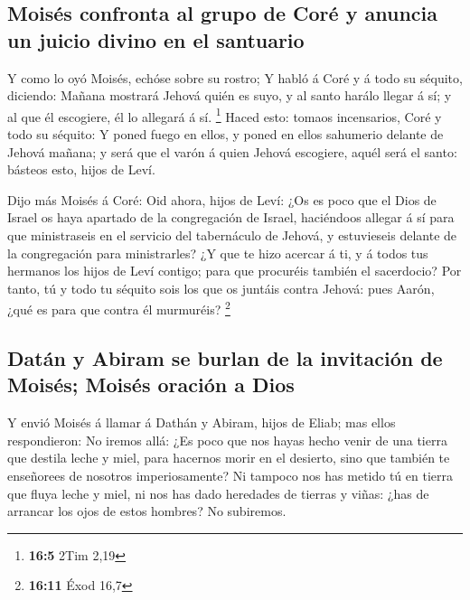 \hypertarget{moisuxe9s-confronta-al-grupo-de-coruxe9-y-anuncia-un-juicio-divino-en-el-santuario}{%
\subsection{Moisés confronta al grupo de Coré y anuncia un juicio divino
en el
santuario}\label{moisuxe9s-confronta-al-grupo-de-coruxe9-y-anuncia-un-juicio-divino-en-el-santuario}}

 Y como lo oyó Moisés, echóse sobre su rostro; 
Y habló á Coré y á todo su séquito, diciendo: Mañana mostrará Jehová
quién es suyo, y al santo harálo llegar á sí; y al que él escogiere, él
lo allegará á sí. \footnote{\textbf{16:5} 2Tim 2,19}  Haced
esto: tomaos incensarios, Coré y todo su séquito:  Y poned
fuego en ellos, y poned en ellos sahumerio delante de Jehová mañana; y
será que el varón á quien Jehová escogiere, aquél será el santo: básteos
esto, hijos de Leví.

 Dijo más Moisés á Coré: Oid ahora, hijos de Leví:
 ¿Os es poco que el Dios de Israel os haya apartado de la
congregación de Israel, haciéndoos allegar á sí para que ministraseis en
el servicio del tabernáculo de Jehová, y estuvieseis delante de la
congregación para ministrarles?  ¿Y que te hizo acercar á
ti, y á todos tus hermanos los hijos de Leví contigo; para que procuréis
también el sacerdocio?  Por tanto, tú y todo tu séquito
sois los que os juntáis contra Jehová: pues Aarón, ¿qué es para que
contra él murmuréis? \footnote{\textbf{16:11} Éxod 16,7}

\hypertarget{datuxe1n-y-abiram-se-burlan-de-la-invitaciuxf3n-de-moisuxe9s-moisuxe9s-oraciuxf3n-a-dios}{%
\subsection{Datán y Abiram se burlan de la invitación de Moisés; Moisés
oración a
Dios}\label{datuxe1n-y-abiram-se-burlan-de-la-invitaciuxf3n-de-moisuxe9s-moisuxe9s-oraciuxf3n-a-dios}}

 Y envió Moisés á llamar á Dathán y Abiram, hijos de Eliab;
mas ellos respondieron: No iremos allá:  ¿Es poco que nos
hayas hecho venir de una tierra que destila leche y miel, para hacernos
morir en el desierto, sino que también te enseñorees de nosotros
imperiosamente?  Ni tampoco nos has metido tú en tierra que
fluya leche y miel, ni nos has dado heredades de tierras y viñas: ¿has
de arrancar los ojos de estos hombres? No subiremos.

